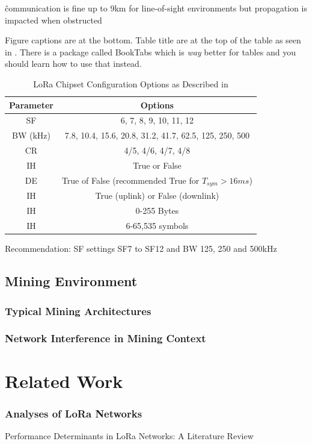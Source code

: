 \documentclass[a4paper,twoside,12pt]{report}
\begin{document}
\^ communication is fine up to 9km for line-of-sight environments but propagation is impacted when obstructed


Figure captions are at the bottom. Table title are at the top of the table as seen in . There is a package called BookTabs which is \textit{way} better for tables and you should learn how to use that instead.

\begin{table}[p]
	\centering
	\caption{LoRa Chipset Configuration Options as Described in \cite{SemtechDatasheet}}
	\label{tab:tab1}
\begin{tabular}{cc}
	\hline
	Parameter & Options\\
	\hline\hline 
	SF & 6, 7, 8, 9, 10, 11, 12 \\ 
	BW (kHz) & 7.8, 10.4, 15.6, 20.8, 31.2, 41.7, 62.5, 125, 250, 500 \\ 
    CR & 4/5, 4/6, 4/7, 4/8 \\ 
    IH & True or False \\ 
    DE & True of False (recommended True for $T_{sym} > 16ms$) \\ 
    IH & True (uplink) or False (downlink) \\ 
    IH & 0-255 Bytes \\ 
    IH & 6-65,535 symbols \\ 
	\hline
\end{tabular} 
\end{table}

Recommendation: SF settings SF7 to SF12 and BW 125, 250 and 500kHz \cite{SemtechDatasheet}

\subsection{Mining Environment}
\subsubsection{Typical Mining Architectures}
\subsubsection{Network Interference in Mining Context}

\section{Related Work}

\subsubsection{Analyses of LoRa Networks}
Performance Determinants in LoRa Networks: A Literature Review \cite{Gkotsiopoulos2021PerformanceReview}
\end{document}
